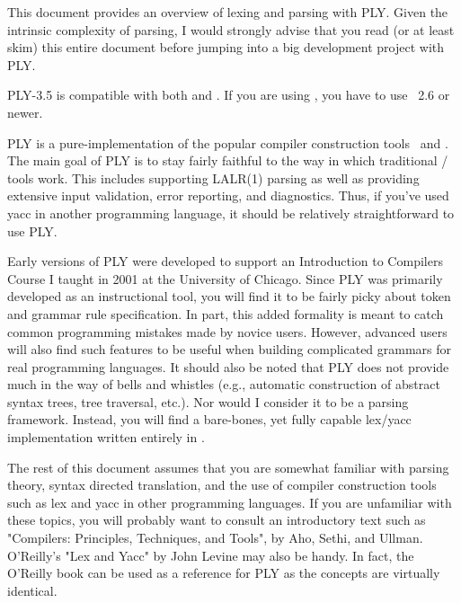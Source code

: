 \secdown
{}

This document provides an overview of lexing and parsing with PLY. Given the
intrinsic complexity of parsing, I would strongly advise that you read (or at
least skim) this entire document before jumping into a big development project
with PLY.

PLY-3.5 is compatible with both  and . If you are using , you
have to use \py\ 2.6 or newer.


PLY is a pure-\py implementation of the popular compiler construction tools
\lex\ and \yacc. The main goal of PLY is to stay fairly faithful to the way in
which traditional / tools work. This includes supporting
LALR(1) parsing as well as providing extensive input validation, error
reporting, and diagnostics. Thus, if you've used yacc in another programming
language, it should be relatively straightforward to use PLY.

Early versions of PLY were developed to support an Introduction to Compilers
Course I taught in 2001 at the University of Chicago. Since PLY was primarily
developed as an instructional tool, you will find it to be fairly picky about
token and grammar rule specification. In part, this added formality is meant to
catch common programming mistakes made by novice users. However, advanced users
will also find such features to be useful when building complicated grammars for
real programming languages. It should also be noted that PLY does not provide
much in the way of bells and whistles (e.g., automatic construction of abstract
syntax trees, tree traversal, etc.). Nor would I consider it to be a parsing
framework. Instead, you will find a bare-bones, yet fully capable lex/yacc
implementation written entirely in \py.

The rest of this document assumes that you are somewhat familiar with parsing
theory, syntax directed translation, and the use of compiler construction tools
such as lex and yacc in other programming languages. If you are unfamiliar with
these topics, you will probably want to consult an introductory text such as
"Compilers: Principles, Techniques, and Tools", by Aho, Sethi, and Ullman.
O'Reilly's "Lex and Yacc" by John Levine may also be handy. In fact, the
O'Reilly book can be used as a reference for PLY as the concepts are virtually
identical.

